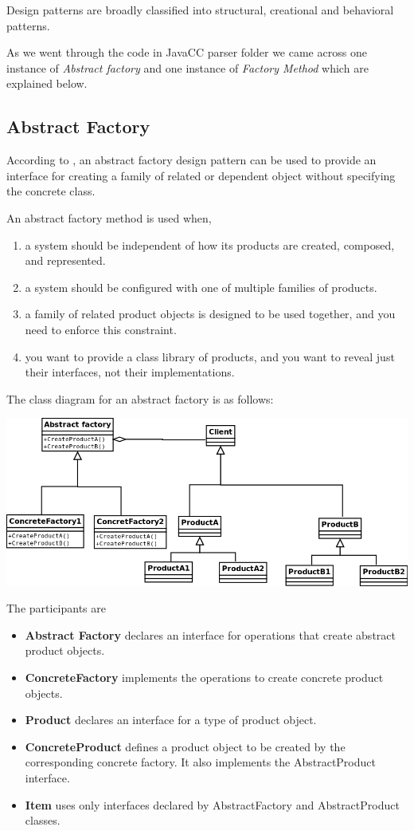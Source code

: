 \documentclass[•]{book}
\begin{document}
Design patterns are broadly classified into structural, creational and behavioral patterns.

As we went through the code in JavaCC parser folder we came across one instance of \textit{Abstract factory} and one instance of \textit{Factory Method} which are explained below.
\subsection{Abstract Factory}
According to \cite{gamma1994}, an abstract factory design pattern can be used to provide an interface for creating a family of related or dependent object without specifying the concrete class.

An abstract factory method is used when,
\begin{enumerate}
\item a system should be independent of how its products are created, composed, and represented.
\item a system should be configured with one of multiple families of products.
\item a family of related product objects is designed to be used together, and you need to enforce this
constraint.
\item you want to provide a class library of products, and you want to reveal just their interfaces, not
their implementations.
\end{enumerate}   

The class diagram for an abstract factory is as follows:

\begin{center}
\includegraphics[scale=0.5]{AbstractFactory.png}
\end{center}

The participants are 
\begin{itemize}
\item \textbf{Abstract Factory} declares an interface for operations that create abstract product objects.
\item \textbf{ConcreteFactory} implements the operations to create concrete product objects.
\item \textbf{Product} declares an interface for a type of product object.
\item \textbf{ConcreteProduct} defines a product object to be created by the corresponding concrete factory. It also implements the AbstractProduct interface.
\item \textbf{Item} uses only interfaces declared by AbstractFactory and AbstractProduct classes.


\end{itemize}
\end{document}
